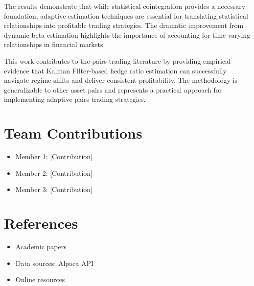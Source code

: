 \documentclass[11pt]{article}
\begin{document}
The results demonstrate that while statistical cointegration provides a necessary foundation, adaptive estimation techniques are essential for translating statistical relationships into profitable trading strategies. The dramatic improvement from dynamic beta estimation highlights the importance of accounting for time-varying relationships in financial markets.

This work contributes to the pairs trading literature by providing empirical evidence that Kalman Filter-based hedge ratio estimation can successfully navigate regime shifts and deliver consistent profitability. The methodology is generalizable to other asset pairs and represents a practical approach for implementing adaptive pairs trading strategies.

\section{Team Contributions}

\begin{itemize}
\item Member 1: [Contribution]
\item Member 2: [Contribution]
\item Member 3: [Contribution]
\end{itemize}

\section{References}

\begin{itemize}
\item Academic papers
\item Data sources: Alpaca API
\item Online resources
\end{itemize}
\end{document}
